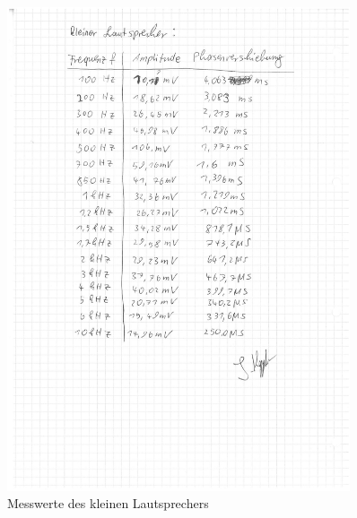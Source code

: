 \documentclass[12pt, oneside, a4paper, \docLanguage]{report}
\begin{document}
\begin{normalsize}
\begin{figure}[H]
\includegraphics[width=0.9\textwidth]{../MeasurementSmallSpeaker.png}
\caption{Messwerte des kleinen Lautsprechers}
\end{figure}
\end{normalsize}

%
%

\end{document}
